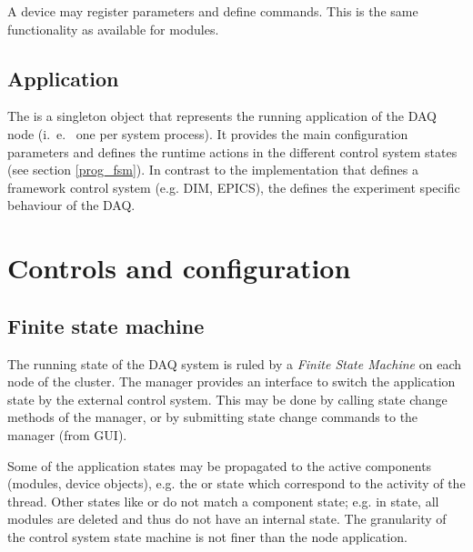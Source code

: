 A device may register parameters and define 
commands. This is the same functionality as available for modules.   


\subsection{Application}
The  
is a singleton object that represents the running application of the DAQ node 
(i.~e.~ one per system process). It provides the main configuration parameters
and defines the runtime actions in the different control system states (see section \ref{prog_fsm}).
In contrast to the  implementation that defines a framework control system (e.g. DIM, EPICS), the  defines the experiment specific behaviour of the DAQ.

\section{Controls and configuration}
\subsection{Finite state machine}

The running state of the DAQ system is ruled by a {\sl Finite State Machine} 
\cite{Wikipedia-Statemachine} 
on  each node of the cluster. The manager provides an interface to switch the application 
state by the external control system. This may be done by calling 
state change methods of the manager, or by submitting state change commands 
to the manager (from GUI).

Some of the application states may be propagated to the 
active components (modules, device objects), e.g. the 
 or  state which correspond to the activity of the thread. 
Other states like  or  do not match a component state; 
e.g. in  state, all modules are deleted and thus do not 
have an internal state. The granularity of the control system state 
machine is not finer than the node application.





